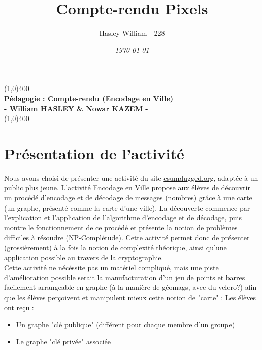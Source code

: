 \documentclass{article}
\title{\textbf{Compte-rendu Pixels}}
\date{\textit{\today}}
\author{Hasley William - 228}
\begin{document}
\begin{titlepage}

\begin{center}

\vfill
\line(1,0){400}\\
\huge{\textbf{Pédagogie : Compte-rendu (Encodage en Ville)}}\\[3mm]
\Large{\textbf{- William HASLEY \& Nowar KAZEM - }}\\[1mm]
\line(1,0){400}
\vfill
\end{center}


\begin{flushleft}

\renewcommand{\contentsname}{Sommaire}  %
\tableofcontents
\vfill
\end{flushleft}

\end{titlepage}

\newpage

\section{Présentation de l'activité}

Nous avons choisi de présenter une activité du site \href{https://classic.csunplugged.org/documents/activities/public-key-encryption/unplugged-18-public_key_encryption_0.pdf}{csunplugged.org}, adaptée à un public plus jeune. L'activité Encodage en Ville propose aux élèves de découvrir un procédé d'encodage et de décodage de messages (nombres) grâce à une carte (un graphe, présenté comme la carte d'une ville). La découverte commence par l'explication et l'application de l'algorithme d'encodage et de décodage, puis montre le fonctionnement de ce procédé et présente la notion de problèmes difficiles à résoudre (NP-Complétude). Cette activité permet donc de présenter (grossièrement) à la fois la notion de complexité théorique, ainsi qu'une application possible au travers de la cryptographie.\\

Cette activité ne nécéssite pas un matériel compliqué, mais une piste d'amélioration possible serait la manufacturation d'un jeu de points et barres facilement arrangeable en graphe (à la manière de géomags, avec du velcro?) afin que les élèves perçoivent et manipulent mieux cette notion de "carte" : Les élèves ont reçu : \begin{itemize}
\item Un graphe "clé publique" (différent pour chaque membre d'un groupe)
\item Le graphe "clé privée" associée
\end{itemize}
\end{document}
